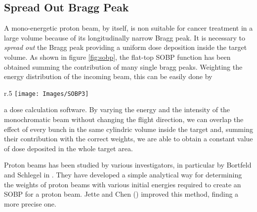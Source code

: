 \documentclass[12pt, a4paper, twoside]{book}
\begin{document}
\subsection{Spread Out Bragg Peak}
\label{sec:sobp}

A mono-energetic proton beam, by itself, is non suitable for cancer treatment in a large volume because of its longitudinally narrow Bragg peak. 
It is necessary to \emph{spread out} the Bragg peak providing a uniform dose deposition inside the target volume. As shown in figure  \ref{fig:sobp}, the flat-top SOBP function has been obtained summing the contribution of many single bragg peaks. Weighting the energy distribution of the incoming beam, this can be easily done by 
\begin{wrapfigure}{r}{.5\textwidth}
{\texttt{[image: Images/SOBP3]}}
\caption{Comparison between protons Spread Out Bragg Peak and photons energy loss in matter. From Degiovanni \cite{deg:lin}}
\label{fig:sobp}
\vspace{-10mm}
\end{wrapfigure}
\noindent a dose calculation software.
By varying the energy and the intensity of the monochromatic beam without changing the flight direction, we can overlap the effect of every bunch in the same cylindric volume inside the target and, summing their contribution with the correct weights, we are able to obtain a constant value of dose deposited in the whole target area.

Proton beams has been studied by various investigators, in particular by Bortfeld and Schlegel in \cite{bort:SOBP}. They have developed a simple analytical way for determining the weights of proton beams with various initial energies required to create an SOBP for a proton beam. Jette and Chen (\cite{jett:SOBP}) improved this method, finding a more precise one. 
\end{document}
